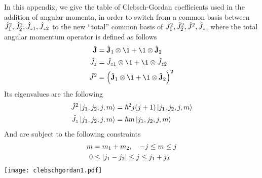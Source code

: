 \documentclass[../qm.tex]{subfiles}
\begin{document}
	In this appendix, we give the table of Clebsch-Gordan coefficients used in the addition of angular momenta, in order to switch from a common basis between $\hat{J}^2_1,\hat{J}^2_2,\hat{J}_{z1},\hat{J}_{z2}$ to the new ``total'' common basis of $\hat{J}^2_1,\hat{J}^2_2,\hat{J}^2,\hat{J}_z$, where the total angular momentum operator is defined as follows
	\begin{equation}
		\begin{aligned}
			\vecopr{J}&=\vecopr{J}_1\otimes\1+\1\otimes\vecopr{J}_2\\
			\opr{J}_z&=\opr{J}_{z1}\otimes\1+\1\otimes\opr{J}_{z2}\\
			\opr{J}^2&=\left( \vecopr{J}_1\otimes\1+\1\otimes\vecopr{J}_2 \right)^2
		\end{aligned}
		\label{eq:cgcoeffputt}
	\end{equation}
	Its eigenvalues are the following
	\begin{equation}
		\begin{aligned}
			\hat{J}^2\ket{j_1,j_2,j,m}&=\hbar^2j(j+1)\ket{j_1,j_2,j,m}\\
			\hat{J}_z\ket{j_1,j_2,j,m}&=\hbar m\ket{j_1,j_2,j,m}
		\end{aligned}
		\label{eq:jsqeigenvalputt}
	\end{equation}
	And are subject to the following constraints
	\begin{equation}
		\begin{aligned}
			m&=m_1+m_2,\quad-j\le m\le j\\
			0&\le\abs{j_1-j_2}\le j\le j_1+j_2
		\end{aligned}
		\label{eq:eigenvaltotangmom}
	\end{equation}
	\newpage
	\texttt{[image: clebschgordan1.pdf]}
\end{document}
